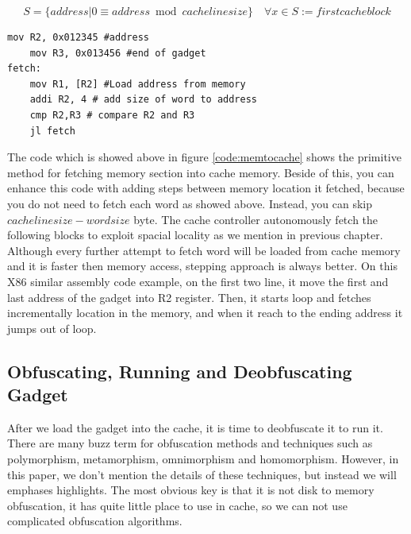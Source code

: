  	    	\begin{equation}
 	    		S = \{address | 0\equiv address \bmod{cache line size}\} \quad
 	    		\forall x \in S := first cache block
 	    	\end{equation} 

			\begin{lstlisting}[caption=The code example for loading a section of memory to cache, label=code:memtocache]
	mov R2, 0x012345 #address
	mov R3, 0x013456 #end of gadget
fetch: 	
	mov R1, [R2] #Load address from memory
	addi R2, 4 # add size of word to address
	cmp R2,R3 # compare R2 and R3
	jl fetch
			\end{lstlisting}

			The code which is showed above in figure \ref{code:memtocache} shows the primitive method for fetching memory section into cache memory. Beside of this, you can enhance this code with adding steps between memory location it fetched, because you do not need to fetch each word as showed above. Instead, you can skip $cachelinesize - wordsize$ byte. The cache controller autonomously fetch the following blocks to exploit spacial locality as we mention in previous chapter. Although every further attempt to fetch word will be loaded from cache memory and it is faster then memory access, stepping approach is always better. On this X86 similar assembly code example, on the first two line, it move the first and last address of the gadget into R2 register. Then, it starts loop and fetches incrementally location in the memory, and when it reach to the ending address it jumps out of loop. 
	    \subsection{Obfuscating, Running and Deobfuscating Gadget}
			After we load the gadget into the cache, it is time to deobfuscate it to run it. There are many buzz term for obfuscation methods and techniques such as polymorphism, metamorphism, omnimorphism and homomorphism\cite{nachenberg1996understanding}\cite{li2011mechanisms}\cite{marpaung2012survey}\cite{balakrishnan2005code}. However, in this paper, we don't mention the details of these techniques, but instead we will emphases highlights. The most obvious key is that it is not disk to memory obfuscation, it has quite little place to use in cache, so we can not use complicated obfuscation algorithms. 

